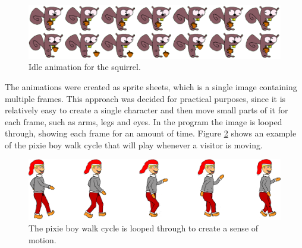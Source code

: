 \begin{figure}[htbp]
\centering
\includegraphics[width=1.00\textwidth]{Pictures/Design/squirrel_animation}
\caption{Idle animation for the squirrel.}
\label{fig:squirrel_animation}
\end{figure}

The animations were created as sprite sheets, which is a single image containing multiple frames. This approach was decided for practical purposes, since it is relatively easy to create a single character and then move small parts of it for each frame, such as arms, legs and eyes. In the program the image is looped through, showing each frame for an amount of time. Figure \ref{fig:Design_PixieBoyWalking} shows an example of the pixie boy walk cycle that will play whenever a visitor is moving.

\begin{figure}[htbp]
\centering
\includegraphics[width=1.00\textwidth]{Pictures/Design/PixieWalking.png}
\caption{The pixie boy walk cycle is looped through to create a sense of motion.}
\label{fig:Design_PixieBoyWalking}
\end{figure}